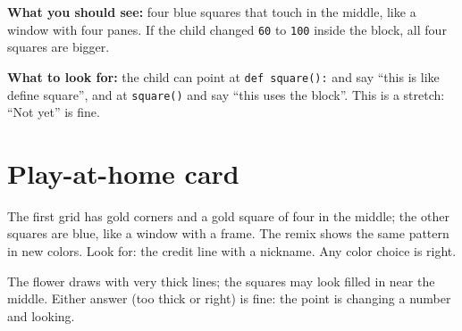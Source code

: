 \begin{answer}
\textbf{What you should see:} four blue squares that touch in the middle, like a window with four panes. If the child changed \texttt{60} to \texttt{100} inside the block, all four squares are bigger.

\textbf{What to look for:} the child can point at \texttt{def square():} and say \enquote{this is like define square}, and at \texttt{square()} and say \enquote{this uses the block}. This is a stretch: \enquote{Not yet} is fine.
\end{answer}

\section{Play-at-home card}
\begin{answer}
The first grid has gold corners and a gold square of four in the middle; the other squares are blue, like a window with a frame. The remix shows the same pattern in new colors. Look for: the credit line with a nickname. Any color choice is right.
\end{answer}

\begin{answer}
The flower draws with very thick lines; the squares may look filled in near the middle. Either answer (too thick or right) is fine: the point is changing a number and looking.
\end{answer}
